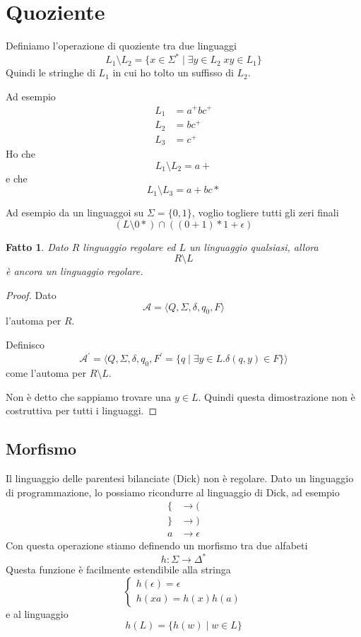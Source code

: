 \documentclass[12pt]{report}
\newtheorem{fatto}{Fatto}
\begin{document}

\section{Quoziente}
Definiamo l'operazione di quoziente tra due linguaggi
$$ L_1 \setminus L_2 = \{ x \in \Sigma^* \mid \exists y \in L_2 \; xy \in L_1 \} $$
Quindi le stringhe di $L_1$ in cui ho tolto un suffisso di $L_2$.
\begin{tcolorbox}
	Ad esempio
	\begin{align*}
		L_1 &= a^+bc^+ \\
		L_2 &= bc^+  \\
		L_3 &= c^+
	\end{align*}
	Ho che
	$$ L_1 \setminus L_2 = a+ $$
	e che
	$$ L_1 \setminus L_3 = a+bc* $$
\end{tcolorbox}

\begin{tcolorbox}
	Ad esempio da un linguaggoi su $\Sigma = \{0, 1\}$, voglio togliere tutti gli zeri finali
	$$(L \setminus 0*) \cap ((0 + 1)*1 + \epsilon)$$
\end{tcolorbox}
\begin{fatto}
	Dato $R$ linguaggio regolare ed $L$ un linguaggio qualsiasi, allora
	$$ R \setminus L $$
	è ancora un linguaggio regolare.
\end{fatto}
\begin{proof}
	Dato
	$$ \mathcal{A} = \langle Q, \Sigma, \delta, q_0, F \rangle $$
	l'automa per $R$.

	Definisco 
	$$ \mathcal{A}^\prime = \langle Q, \Sigma, \delta, q_0, F^\prime = \{ q \mid \exists y \in L . \delta(q, y) \in F \} \rangle $$
	come l'automa per $R \setminus L$.

	Non è detto che sappiamo trovare una $y \in L$.
	Quindi questa dimostrazione non è costruttiva per tutti i linguaggi.
\end{proof}

\subsection{Morfismo}
Il linguaggio delle parentesi bilanciate (Dick) non è regolare.
Dato un linguaggio di programmazione, lo possiamo ricondurre al linguaggio di Dick, ad esempio
\begin{align*}
	\{ &\rightarrow ( \\
	\} &\rightarrow ) \\
	a  &\rightarrow \epsilon 
\end{align*}
Con questa operazione stiamo definendo un morfismo tra due alfabeti
$$ h : \Sigma \rightarrow \Delta^* $$
Questa funzione è facilmente estendibile alla stringa
$$
\begin{cases}
	h(\epsilon) = \epsilon \\
	h(xa) = h(x) h(a) 
\end{cases}
$$
e al linguaggio 
$$ h(L) = \{ h(w) \mid w \in L \} $$
\end{document}
